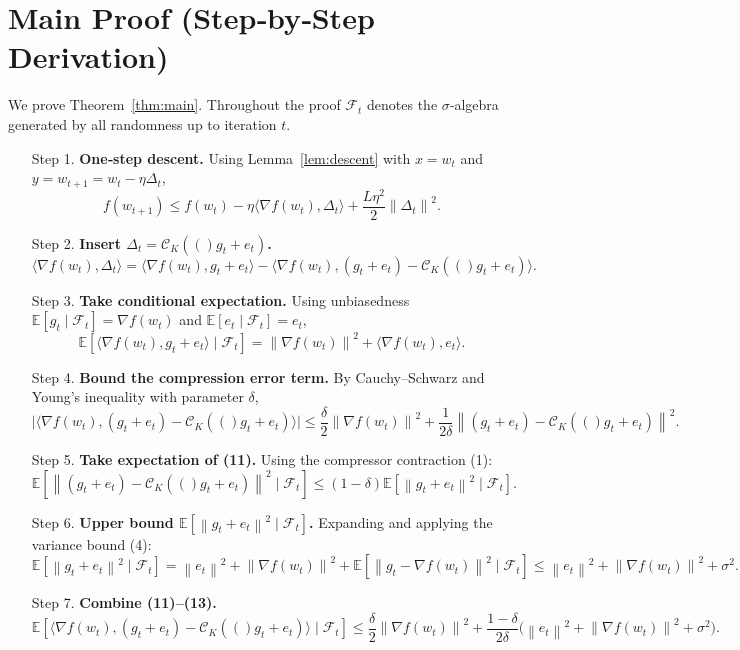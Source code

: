 \documentclass[11pt]{article}
\newcommand{\E}{\mathbb{E}}
\newcommand{\norm}[1]{\left\|#1\right\|}
\newcommand{\inner}[2]{\langle #1,#2\rangle}
\newcommand{\cK}[1]{\mathcal{C}_K(#1)}   %
\newcommand{\grad}{\nabla}
\begin{document}
\section*{Main Proof (Step‑by‑Step Derivation)}
We prove Theorem~\ref{thm:main}. Throughout the proof $\mathcal{F}_t$ denotes the $\sigma$‑algebra generated by all randomness up to iteration $t$.

\begin{enumerate}
\item[Step 1.] \textbf{One‑step descent.} Using Lemma~\ref{lem:descent} with $x=w_t$ and $y=w_{t+1}=w_t-\eta\Delta_t$,
\[
f(w_{t+1})\le f(w_t)-\eta\inner{\grad f(w_t)}{\Delta_t}
       +\frac{L\eta^{2}}{2}\norm{\Delta_t}^{2}.
\tag{8}
\]

\item[Step 2.] \textbf{Insert $\Delta_t=\cK(g_t+e_t)$.}
\[
\inner{\grad f(w_t)}{\Delta_t}
 =\inner{\grad f(w_t)}{g_t+e_t}
   -\inner{\grad f(w_t)}{(g_t+e_t)-\cK(g_t+e_t)}.
\tag{9}
\]

\item[Step 3.] \textbf{Take conditional expectation.}
Using unbiasedness $\E[g_t\mid\mathcal{F}_t]=\grad f(w_t)$ and $\E[e_t\mid\mathcal{F}_t]=e_t$,
\[
\E\!\left[\inner{\grad f(w_t)}{g_t+e_t}\mid\mathcal{F}_t\right]
 =\norm{\grad f(w_t)}^{2}+\inner{\grad f(w_t)}{e_t}.
\tag{10}
\]

\item[Step 4.] \textbf{Bound the compression error term.}
By Cauchy–Schwarz and Young’s inequality with parameter $\delta$,
\[
\bigl|\inner{\grad f(w_t)}{(g_t+e_t)-\cK(g_t+e_t)}\bigr|
 \le \frac{\delta}{2}\norm{\grad f(w_t)}^{2}
      +\frac{1}{2\delta}\norm{(g_t+e_t)-\cK(g_t+e_t)}^{2}.
\tag{11}
\]

\item[Step 5.] \textbf{Take expectation of (11).}
Using the compressor contraction (1):
\[
\E\!\left[\norm{(g_t+e_t)-\cK(g_t+e_t)}^{2}\mid\mathcal{F}_t\right]
 \le (1-\delta)\E\!\left[\norm{g_t+e_t}^{2}\mid\mathcal{F}_t\right].
\tag{12}
\]

\item[Step 6.] \textbf{Upper bound $\E[\norm{g_t+e_t}^{2}\mid\mathcal{F}_t]$.}
Expanding and applying the variance bound (4):
\[
\E\!\left[\norm{g_t+e_t}^{2}\mid\mathcal{F}_t\right]
 =\norm{e_t}^{2}+ \norm{\grad f(w_t)}^{2} + \E\!\left[\norm{g_t-\grad f(w_t)}^{2}\mid\mathcal{F}_t\right]
 \le \norm{e_t}^{2}+ \norm{\grad f(w_t)}^{2}+ \sigma^{2}.
\tag{13}
\]

\item[Step 7.] \textbf{Combine (11)–(13).}
\[
\E\!\left[\inner{\grad f(w_t)}{(g_t+e_t)-\cK(g_t+e_t)}\mid\mathcal{F}_t\right]
 \le \frac{\delta}{2}\norm{\grad f(w_t)}^{2}
      +\frac{1-\delta}{2\delta}\bigl(\norm{e_t}^{2}+ \norm{\grad f(w_t)}^{2}+ \sigma^{2}\bigr).
\tag{14}
\]


\end{enumerate}
\end{document}

